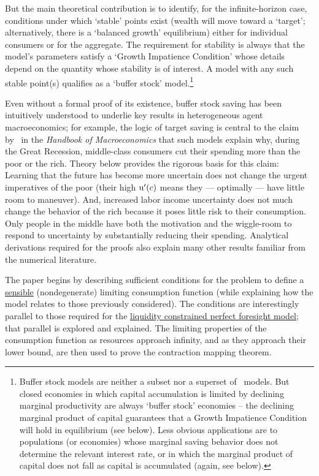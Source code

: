 \documentclass[BufferStockTheory]{subfiles}
\begin{document}
But the main theoretical contribution is to identify, for the infinite-horizon case, conditions under which `stable' points exist (wealth will move toward a `target'; alternatively, there is a `balanced growth' equilibrium) either for individual consumers or for the aggregate.  The requirement for stability is always that the model's parameters satisfy a `Growth Impatience Condition' whose details depend on the quantity whose stability is of interest.  A model with any such stable point(s) qualifies as a `buffer stock' model.\footnote{Buffer stock models are neither a subset nor a superset of~\cite{bewleyPIH} models.  But closed economies in which capital accumulation is limited by declining marginal productivity are always `buffer stock' economies -- the declining marginal product of capital guarantees that a Growth Impatience Condition will hold in equilibrium (see below).  Less obvious applications are to populations (or economies) whose marginal saving behavior does not determine the relevant interest rate, or in which the marginal product of capital does not fall as capital is accumulated (again, see below).}

\hypertarget{KMP}{} Even without a formal proof of its existence, buffer stock saving has been intuitively understood to underlie key results in heterogeneous agent macroeconomics; for example, the logic of target saving is central to the claim by~\cite{kmpHandbook} in the \textit{Handbook of Macroeconomics} that such models explain why, during the Great Recession, middle-class consumers cut their spending more than the poor or the rich.  Theory below provides the rigorous basis for this claim:  Learning that the future has become more uncertain does not change the urgent imperatives of the poor (their high $\mathrm{u}^{\prime}(c)$ means they --- optimally --- have little room to maneuver).  And, increased labor income uncertainty does not much change the behavior of the rich because it poses little risk to their consumption.  Only people in the middle have both the motivation and the wiggle-room to respond to uncertainty by substantially reducing their spending.  Analytical derivations required for the proofs also explain many other results familiar from the numerical literature.

The paper begins by describing sufficient conditions for the problem to define a \hyperlink{sensible}{sensible} (nondegenerate) limiting consumption function (while explaining how the model relates to those previously considered).  The conditions are interestingly parallel to those required for the \hyperlink{Factors-Defined-And-Compared}{liquidity constrained perfect foresight model}; that parallel is explored and explained.  The limiting properties of the consumption function as resources approach infinity, and as they approach their lower bound, are then used to prove the contraction mapping theorem.
\end{document}
